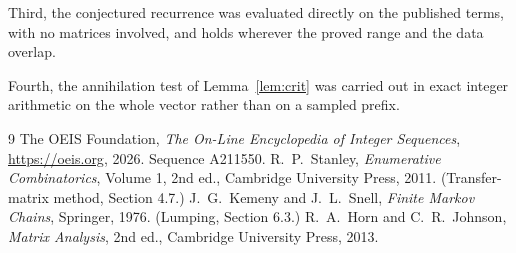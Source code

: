 \documentclass[11pt,a4paper]{article}
\theoremstyle{plain}
\theoremstyle{definition}
\begin{document}
Third, the conjectured recurrence was evaluated directly on the published terms, with no
matrices involved, and holds wherever the proved range and the data overlap.

Fourth, the annihilation test of Lemma~\ref{lem:crit} was carried out in exact integer
arithmetic on the whole vector rather than on a sampled prefix.

\begin{thebibliography}{9}
 The OEIS Foundation, \emph{The On-Line Encyclopedia of Integer
Sequences}, \url{https://oeis.org}, 2026. Sequence A211550.
 R.~P.~Stanley, \emph{Enumerative Combinatorics}, Volume 1, 2nd ed.,
Cambridge University Press, 2011. (Transfer-matrix method, Section 4.7.)
 J.~G.~Kemeny and J.~L.~Snell, \emph{Finite Markov Chains}, Springer, 1976.
(Lumping, Section 6.3.)
 R.~A.~Horn and C.~R.~Johnson, \emph{Matrix Analysis}, 2nd ed., Cambridge
University Press, 2013.
\end{thebibliography}
\end{document}

